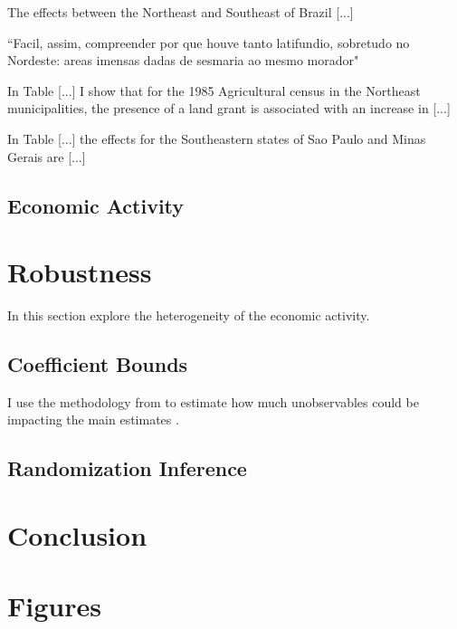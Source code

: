 \documentclass{article}
\begin{document}
The effects between the Northeast and Southeast of Brazil [...]

``Facil, assim, compreender por que houve tanto latifundio, sobretudo no Nordeste: areas imensas dadas de sesmaria ao mesmo morador" \parencite[p.~53]{Da_Costa_Porto1979-dz}

In Table [...] I show that for the 1985 Agricultural census in the Northeast municipalities, the presence of a land grant is associated with an increase in [...]

In Table [...] the effects for the Southeastern states of Sao Paulo and Minas Gerais are [...]

\parencite{Mueller1995-gi}

\subsection{Economic Activity}

\section{Robustness}

In this section explore the heterogeneity of the economic activity. 

\subsection{Coefficient Bounds}

I use the methodology from to estimate how much unobservables could be impacting the main estimates \textcite{Masten2022-bg}.

\subsection{Randomization Inference}

\section{Conclusion}

\clearpage



\printbibliography

\clearpage

\section*{Figures}
\end{document}
